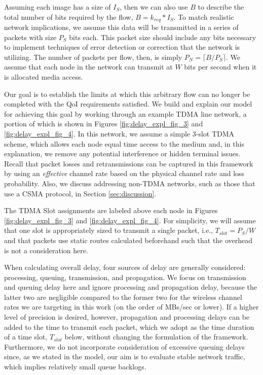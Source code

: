 Assuming each image has a size of $I_S$, then we can also use $B$ to describe the total number of bits required by the flow, $B=k_{req}*I_S$.  To match realistic network implications, we assume this data will be transmitted in a series of packets with size $P_S$ bits each. This packet size should include any bits necessary to implement techniques of error detection or correction that the network is utilizing. The number of packets per flow, then, is simply $P_N = \lceil B/P_S \rceil$.  We assume that each node in the network can transmit at $W$ bits per second when it is allocated media access.

Our goal is to establish the limits at which this arbitrary flow can no longer be completed with the QoI requirements satisfied.  We build and explain our model for achieving this goal by working through an example TDMA line network, a portion of which is shown in Figures \ref{fig:delay_expl_fig_3} and \ref{fig:delay_expl_fig_4}. In this network, we assume a simple 3-slot TDMA scheme, which allows each node equal time access to the medium and, in this explanation, we remove any potential interference or hidden terminal issues. Recall that packet losses and retransmissions can be captured in this framework by using an \emph{effective} channel rate based on the physical channel rate and loss probability. Also, we discuss addressing non-TDMA networks, such as those that use a CSMA protocol, in Section \ref{sec:discussion}. 

The TDMA Slot assignments are labeled above each node in Figures \ref{fig:delay_expl_fig_3} and \ref{fig:delay_expl_fig_4}.  For simplicity, we will assume that one slot is appropriately sized to transmit a single packet, i.e., $T_{slot} = P_S/W$ and that packets use static routes calculated beforehand such that the overhead is not a consideration here.

When calculating overall delay, four sources of delay are generally considered: processing, queuing, transmission, and propagation. We focus on transmission and queuing delay here and ignore processing and propagation delay, because the latter two are negligible compared to the former two for the wireless channel rates we are targeting in this work (on the order of MBs/sec or lower). If a higher level of precision is desired, however, propagation and processing delays can be added to the time to transmit each packet, which we adopt as the time duration of a time slot, $T_{slot}$ below, without changing the formulation of the framework. Furthermore, we do not incorporate consideration of excessive queuing delays since, as we stated in the model, our aim is to evaluate stable network traffic, which implies relatively small queue backlogs. %

